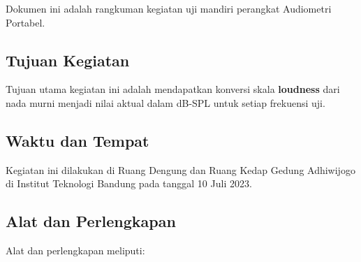 \documentclass{article}
\begin{document}
	Dokumen ini adalah rangkuman kegiatan uji mandiri perangkat Audiometri Portabel.

	\subsection{Tujuan Kegiatan}

	Tujuan utama kegiatan ini adalah mendapatkan konversi skala \textbf{loudness} dari nada murni menjadi nilai aktual dalam dB-SPL untuk setiap frekuensi uji.

	\subsection{Waktu dan Tempat}

	Kegiatan ini dilakukan di Ruang Dengung dan Ruang Kedap Gedung Adhiwijogo di Institut Teknologi Bandung pada tanggal 10 Juli 2023.

	\subsection{Alat dan Perlengkapan}

	Alat dan perlengkapan meliputi:
\end{document}
